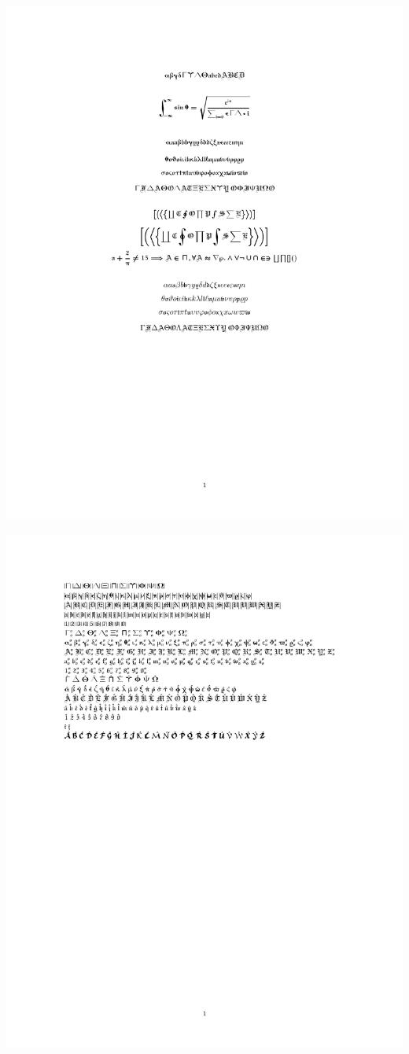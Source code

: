 \documentclass[twocolumn]{article}
\begin{document}
 \noindent\includegraphics*{../results/linotext-font}\par
{} \noindent\includegraphics*{../results/linotext-pos}\par
\end{document}
